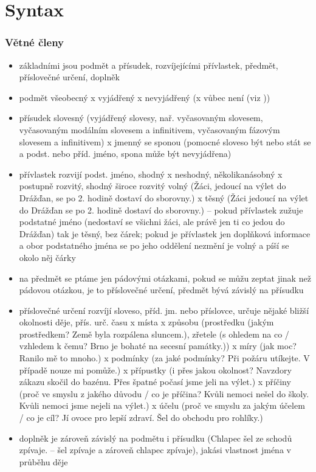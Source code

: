 \documentclass{article}
\begin{document}
\part{Syntax}

\section{Větné členy}
\begin{itemize}
\item základními jsou podmět a přísudek, rozvíjejícími přívlastek, předmět, příslovečné určení, doplněk
\item podmět všeobecný x vyjádřený x nevyjádřený (x vůbec není (viz ))
\item přísudek slovesný (vyjádřený slovesy, nař. vyčasovaným slovesem, vyčasovaným modálním slovesem a infinitivem, vyčasovaným fázovým slovesem a infinitivem) x jmenný se sponou (pomocné sloveso být nebo stát se a podst. nebo příd. jméno, spona může být nevyjádřena)
\item přívlastek rozvijí podst. jméno, shodný x neshodný, několikanásobný x postupně rozvitý, shodný široce rozvitý volný (Žáci, jedoucí na výlet do Drážďan, se po 2. hodině dostaví do sborovny.) x těsný (Žáci jedoucí na výlet do Drážďan se po 2. hodině dostaví do sborovny.) -- pokud přívlastek zužuje podstatné jméno (nedostaví se všichni žáci, ale právě jen ti co jedou do Drážďan) tak je těsný, bez čárek; pokud je přívlastek jen doplňková informace a obor podstatného jména se po jeho oddělení nezmění je volný a píší se okolo něj čárky
\item na předmět se ptáme jen pádovými otázkami, pokud se můžu zeptat jinak než pádovou otázkou, je to příslovečné určení, předmět bývá závislý na přísudku
\item příslovečné určení rozvíjí sloveso, příd. jm. nebo příslovce, určuje nějaké bližší okolnosti děje, přís. urč. času x místa x způsobu (prostředku (jakým prostředkem? Země byla rozpálena sluncem.), zřetele (s ohledem na co / vzhledem k čemu? Brno je bohaté na secesní památky.)) x míry (jak moc? Ranilo mě to mnoho.) x podmínky (za jaké podmínky? Při požáru utíkejte. V případě nouze mi pomůže.) x přípustky (i přes jakou okolnost? Navzdory zákazu skočil do bazénu. Přes špatné počasí jsme jeli na výlet.) x příčiny (proč ve smyslu z jakého důvodu / co je příčina? Kvůli nemoci nešel do školy. Kvůli nemoci jsme nejeli na výlet.) x účelu (proč ve smyslu za jakým účelem / co je cíl? Jí ovoce pro lepší zdraví. Šel do obchodu pro rohlíky.)
\item doplněk je zároveň závislý na podmětu i přísudku (Chlapec šel ze schodů zpívaje. -- šel zpívaje a zároveň chlapec zpívaje), jakási vlastnost jména v průběhu děje
\end{itemize}
\end{document}
